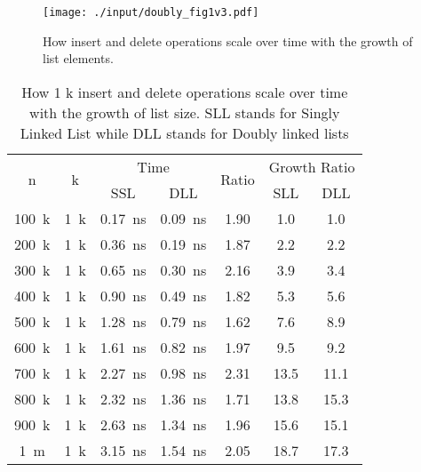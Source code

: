\documentclass[a4paper, 11pt]{article}
\begin{document}
    \begin{figure}[h]
        \centering
        \texttt{[image: ./input/doubly\_fig1v3.pdf]}
        \caption{How insert and delete operations scale over time with the growth of list elements.}
        \label{fig:fig1}
    \end{figure}

    \begin{table}[h]
        \centering
    \begin{tabular}{|c|c|c|c|c|c|c|}
        \hline
\multirow{2}{*}{n} & \multirow{2}{*}{k} & \multicolumn{2}{c|}{Time} & \multirow{2}{*}{Ratio}& \multicolumn{2}{c|}{Growth Ratio}\\
                                        && SSL & DLL & & SLL & DLL \\

\hline 
\SI{100}{k} & \SI{1}{k} & \SI{0.17}{\nano\second} & \SI{0.09}{\nano\second} & \num{1.90} & \num{1.0}  & \num{1.0}\\
\SI{200}{k} & \SI{1}{k} & \SI{0.36}{\nano\second} & \SI{0.19}{\nano\second} & \num{1.87} & \num{2.2}  & \num{2.2}\\
\SI{300}{k} & \SI{1}{k} & \SI{0.65}{\nano\second} & \SI{0.30}{\nano\second} & \num{2.16} & \num{3.9}  & \num{3.4}\\
\SI{400}{k} & \SI{1}{k} & \SI{0.90}{\nano\second} & \SI{0.49}{\nano\second} & \num{1.82} & \num{5.3}  & \num{5.6}\\
\SI{500}{k} & \SI{1}{k} & \SI{1.28}{\nano\second} & \SI{0.79}{\nano\second} & \num{1.62} & \num{7.6}  & \num{8.9}\\
\SI{600}{k} & \SI{1}{k} & \SI{1.61}{\nano\second} & \SI{0.82}{\nano\second} & \num{1.97} & \num{9.5}  & \num{9.2}\\
\SI{700}{k} & \SI{1}{k} & \SI{2.27}{\nano\second} & \SI{0.98}{\nano\second} & \num{2.31} & \num{13.5} & \num{11.1}\\
\SI{800}{k} & \SI{1}{k} & \SI{2.32}{\nano\second} & \SI{1.36}{\nano\second} & \num{1.71} & \num{13.8} & \num{15.3}\\
\SI{900}{k} & \SI{1}{k} & \SI{2.63}{\nano\second} & \SI{1.34}{\nano\second} & \num{1.96} & \num{15.6} & \num{15.1}\\
\SI{1}{m}  & \SI{1}{k} & \SI{3.15}{\nano\second} & \SI{1.54}{\nano\second} & \num{2.05} & \num{18.7} & \num{17.3}\\\hline
\end{tabular}
    \caption{How 1 k insert and delete operations scale over time with the
    growth of list size. SLL stands for Singly Linked List while DLL stands for
    Doubly linked lists}
    \label{tab:growth}
    \end{table}
\end{document}
